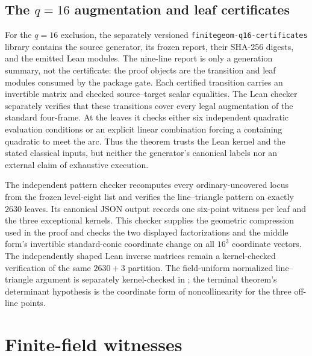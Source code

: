 \documentclass[11pt]{article}
\theoremstyle{definition}
\theoremstyle{remark}
\begin{document}
\subsection{The \texorpdfstring{\(q=16\)}{q=16} augmentation and leaf certificates}
\label{app:q16-certificates}

For the \(q=16\) exclusion, the separately versioned
\texttt{finitegeom-q16-certificates} library contains the source generator,
its frozen report, their SHA-256 digests, and the emitted Lean modules.  The
nine-line report is only a generation summary, not the certificate: the proof
objects are the transition and leaf modules consumed by the package gate.
Each certified transition carries an invertible matrix and
checked source--target scalar equalities.  The Lean checker separately
verifies that these transitions cover every legal augmentation of the
standard four-frame.  At the leaves it checks either six independent
quadratic evaluation conditions or an explicit linear combination forcing
a containing quadratic to meet the arc.  Thus the theorem trusts the Lean
kernel and the stated classical inputs, but neither the generator's
canonical labels nor an external claim of exhaustive execution.

The independent pattern checker recomputes every ordinary-uncovered locus
from the frozen level-eight list and verifies the line--triangle pattern on
exactly \(2630\) leaves.  Its canonical JSON output records one six-point
witness per leaf and the three exceptional kernels.  This checker supplies
the geometric compression used in the proof and checks the two displayed
factorizations and the
middle form's invertible standard-conic coordinate change on all \(16^3\)
coordinate vectors.  The independently shaped Lean inverse matrices remain
a kernel-checked verification of the same \(2630+3\) partition.  The
field-uniform normalized line--triangle argument is separately kernel-checked
in ; the terminal theorem's determinant
hypothesis is the coordinate form of noncollinearity for the three off-line
points.

\section{Finite-field witnesses}\label{app:witnesses}
\end{document}
